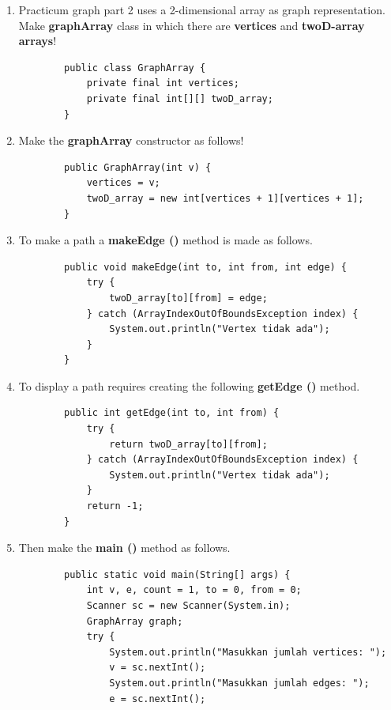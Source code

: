 \documentclass[12pt,titlepage]{article}
\begin{document}
\begin{enumerate}
    \item Practicum graph part 2 uses a 2-dimensional array as graph representation. Make \textbf{graphArray} class in which there are \textbf{vertices} and \textbf{twoD-array arrays}!
    \begin{verbatim}
        public class GraphArray {
            private final int vertices;
            private final int[][] twoD_array;
        }
    \end{verbatim}
    \item Make the \textbf{graphArray} constructor as follows!
    \begin{verbatim}
        public GraphArray(int v) {
            vertices = v;
            twoD_array = new int[vertices + 1][vertices + 1];
        }
    \end{verbatim}
    \item To make a path a \textbf{makeEdge ()} method is made as follows.
    \begin{verbatim}
        public void makeEdge(int to, int from, int edge) {
            try {
                twoD_array[to][from] = edge;
            } catch (ArrayIndexOutOfBoundsException index) {
                System.out.println("Vertex tidak ada");
            }
        }
    \end{verbatim}
    \item To display a path requires creating the following \textbf{getEdge ()} method.
    \begin{verbatim}
        public int getEdge(int to, int from) {
            try {
                return twoD_array[to][from];
            } catch (ArrayIndexOutOfBoundsException index) {
                System.out.println("Vertex tidak ada");
            }
            return -1;
        }
    \end{verbatim}
    \item Then make the \textbf{main ()} method as follows.
    \begin{verbatim}
        public static void main(String[] args) {
            int v, e, count = 1, to = 0, from = 0;
            Scanner sc = new Scanner(System.in);
            GraphArray graph;
            try {
                System.out.println("Masukkan jumlah vertices: ");
                v = sc.nextInt();
                System.out.println("Masukkan jumlah edges: ");
                e = sc.nextInt();


\end{verbatim}
\end{enumerate}
\end{document}
